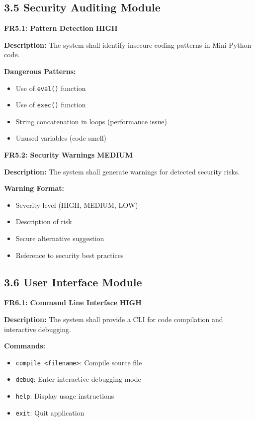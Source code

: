 \documentclass[a4paper,11pt]{article}
\newcommand{\priority}[1]{\colorbox{red!20}{\textbf{#1}}}
\begin{document}
\subsection{3.5 Security Auditing Module}

\textbf{FR5.1: Pattern Detection} \priority{HIGH}

\textbf{Description:} The system shall identify insecure coding patterns in Mini-Python code.

\textbf{Dangerous Patterns:}
\begin{itemize}
    \item Use of \texttt{eval()} function
    \item Use of \texttt{exec()} function
    \item String concatenation in loops (performance issue)
    \item Unused variables (code smell)
\end{itemize}

\vspace{3mm}
\textbf{FR5.2: Security Warnings} \priority{MEDIUM}

\textbf{Description:} The system shall generate warnings for detected security risks.

\textbf{Warning Format:}
\begin{itemize}
    \item Severity level (HIGH, MEDIUM, LOW)
    \item Description of risk
    \item Secure alternative suggestion
    \item Reference to security best practices
\end{itemize}

\subsection{3.6 User Interface Module}

\textbf{FR6.1: Command Line Interface} \priority{HIGH}

\textbf{Description:} The system shall provide a CLI for code compilation and interactive debugging.

\textbf{Commands:}
\begin{itemize}
    \item \texttt{compile <filename>}: Compile source file
    \item \texttt{debug}: Enter interactive debugging mode
    \item \texttt{help}: Display usage instructions
    \item \texttt{exit}: Quit application
\end{itemize}
\end{document}
